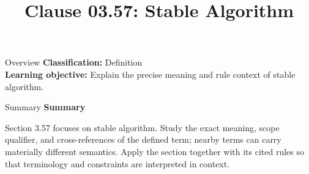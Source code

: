 \documentclass[10pt,letterpaper]{article}
\title{Clause 03.57: Stable Algorithm}
\author{}
\date{}
\begin{document}
\maketitle
\begin{CornellOverviewBox}{Overview}
\textbf{Classification:} Definition\\[2pt]
\textbf{Learning objective:} Explain the precise meaning and rule context of stable algorithm.
\end{CornellOverviewBox}\begin{CornellSummaryBox}{Summary}
{\sffamily\bfseries\color{Accent} Summary}\par\vspace{3pt}Section 3.57 focuses on stable algorithm. Study the exact meaning, scope qualifier, and cross-references of the defined term; nearby terms can carry materially different semantics. Apply the section together with its cited rules so that terminology and constraints are interpreted in context.
\end{CornellSummaryBox}
\end{document}
